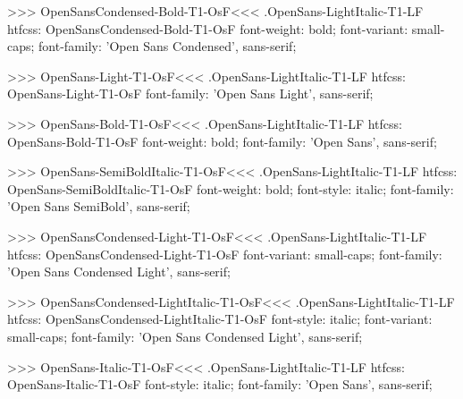 >>>
\<OpenSansCondensed-Bold-T1-OsF\><<<
.OpenSans-LightItalic-T1-LF
htfcss:  OpenSansCondensed-Bold-T1-OsF  font-weight: bold; font-variant: small-caps; font-family: 'Open Sans Condensed', sans-serif;

>>>
\<OpenSans-Light-T1-OsF\><<<
.OpenSans-LightItalic-T1-LF
htfcss:  OpenSans-Light-T1-OsF  font-family: 'Open Sans Light', sans-serif;

>>>
\<OpenSans-Bold-T1-OsF\><<<
.OpenSans-LightItalic-T1-LF
htfcss:  OpenSans-Bold-T1-OsF  font-weight: bold; font-family: 'Open Sans', sans-serif;

>>>
\<OpenSans-SemiBoldItalic-T1-OsF\><<<
.OpenSans-LightItalic-T1-LF
htfcss:  OpenSans-SemiBoldItalic-T1-OsF  font-weight: bold; font-style: italic; font-family: 'Open Sans SemiBold', sans-serif;

>>>
\<OpenSansCondensed-Light-T1-OsF\><<<
.OpenSans-LightItalic-T1-LF
htfcss:  OpenSansCondensed-Light-T1-OsF  font-variant: small-caps; font-family: 'Open Sans Condensed Light', sans-serif;

>>>
\<OpenSansCondensed-LightItalic-T1-OsF\><<<
.OpenSans-LightItalic-T1-LF
htfcss:  OpenSansCondensed-LightItalic-T1-OsF  font-style: italic; font-variant: small-caps; font-family: 'Open Sans Condensed Light', sans-serif;

>>>
\<OpenSans-Italic-T1-OsF\><<<
.OpenSans-LightItalic-T1-LF
htfcss:  OpenSans-Italic-T1-OsF  font-style: italic; font-family: 'Open Sans', sans-serif;

